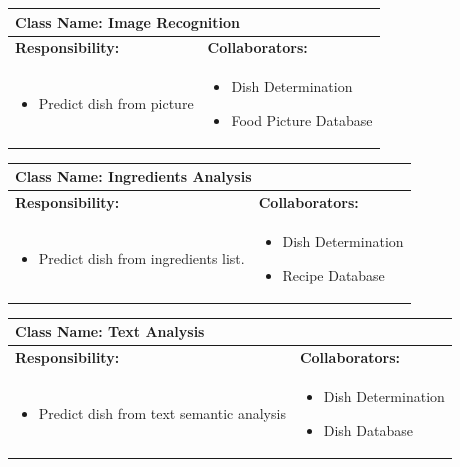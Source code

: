 \documentclass[]{article}
\begin{document}
\begin{table}[H]
	\centering
	\begin{tabular}{|p{7cm}|p{7cm}|}
	\hline 
	 \multicolumn{2}{|l|}{\textbf{Class Name: Image Recognition}} \\
	\hline
	\textbf{Responsibility:} & \textbf{Collaborators:} \\
	\hline
	\raggedright
	\begin{itemize}
		\item Predict dish from picture
	\end{itemize}
	\vspace{1in} & 
	\begin{itemize}
		\item Dish Determination
		\item Food Picture Database
	\end{itemize} \\
	\hline
	\end{tabular}
\end{table}

\begin{table}[H]
	\centering
	\begin{tabular}{|p{7cm}|p{7cm}|}
	\hline 
	 \multicolumn{2}{|l|}{\textbf{Class Name: Ingredients Analysis}} \\
	\hline
	\textbf{Responsibility:} & \textbf{Collaborators:} \\
	\hline
	\raggedright
	\begin{itemize}
		\item Predict dish from ingredients list.
	\end{itemize}
	\vspace{1in} & 
	\begin{itemize}
		\item Dish Determination
		\item Recipe Database
	\end{itemize} \\
	\hline
	\end{tabular}
\end{table}

\begin{table}[H]
	\centering
	\begin{tabular}{|p{7cm}|p{7cm}|}
	\hline 
	 \multicolumn{2}{|l|}{\textbf{Class Name: Text Analysis}} \\
	\hline
	\textbf{Responsibility:} & \textbf{Collaborators:} \\
	\hline
	\raggedright
	\begin{itemize}
		\item Predict dish from text semantic analysis
	\end{itemize}
	\vspace{1in} & 
	\begin{itemize}
		\item Dish Determination
		\item Dish Database
	\end{itemize} \\
	\hline
	\end{tabular}
\end{table}
\end{document}

